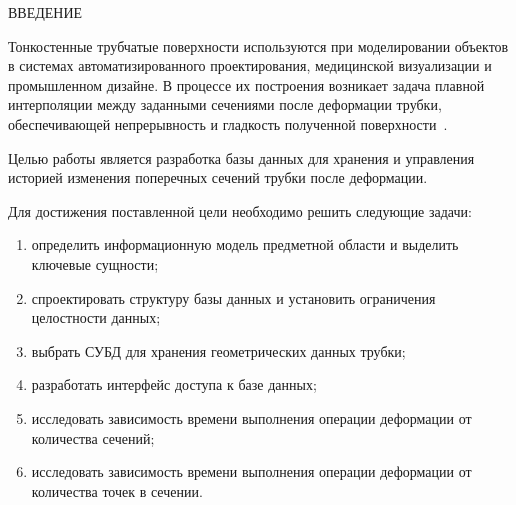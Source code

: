 \begin{center}
    \MakeUppercase{\large ВВЕДЕНИЕ}
\end{center}

\noindent
\hspace{1.25cm}
Тонкостенные трубчатые поверхности используются при моделировании объектов в системах автоматизированного проектирования, медицинской визуализации и промышленном дизайне. В процессе их построения возникает задача плавной интерполяции между заданными сечениями после деформации трубки, обеспечивающей непрерывность и гладкость полученной поверхности~\cite{Ivanov}.

\noindent
\hspace{1.25cm}
Целью работы является разработка базы данных для хранения и управления историей изменения поперечных сечений трубки после деформации.

\noindent
\hspace{1.25cm}
Для достижения поставленной цели необходимо решить следующие задачи:

\renewcommand{\labelenumi}{\theenumi}
\begin{enumerate}

\item определить информационную модель предметной области и выделить ключевые сущности;

\item спроектировать структуру базы данных и установить ограничения целостности данных;

\item выбрать СУБД для хранения геометрических данных трубки;

\item разработать интерфейс доступа к базе данных;

\item исследовать зависимость времени выполнения операции деформации от количества сечений;

\item исследовать зависимость времени выполнения операции деформации от количества точек в сечении.

\end{enumerate}

\newpage